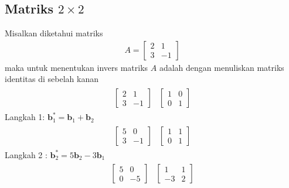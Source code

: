 \documentclass{article}   %
\begin{document}
		\subsection{Matriks $2\times 2$}
		Misalkan diketahui matriks 
		\begin{align*}
		A = \left[
		\begin{array}{rr} 
			2 & 1 \\
			3 & -1 
		\end{array} 
		\right]
	\end{align*}
maka untuk menentukan invers matriks $A$ adalah dengan menuliskan matriks identitas di sebelah kanan
 	\begin{align*}
 	\begin{array}{r|r} 
 		 \left[
 		\begin{array}{rr} 
 			2 & 1 \\
 			3 & -1 
 		\end{array} 
 		\right]  &  \left[
 		\begin{array}{rr} 
 			1 & 0 \\
 			0 & 1 
 		\end{array} 
 		\right]
 	\end{array}
 \end{align*}
Langkah 1: $\textbf{b}^*_1= \textbf{b}_1 + \textbf{b}_2$ \\
\begin{align*}
	\begin{array}{r|r} 
		\left[
		\begin{array}{rr} 
			5 & 0 \\
			3 & -1 
		\end{array} 
		\right]  &  \left[
		\begin{array}{rr} 
			1 & 1 \\
			0 & 1 
		\end{array} 
		\right]
	\end{array}
\end{align*}
Langkah 2 : $\textbf{b}^*_2= 5\textbf{b}_2 - 3\textbf{b}_1$ \\
\begin{align*}
	\begin{array}{r|r} 
		\left[
		\begin{array}{rr} 
			5 & 0 \\
			0 & -5 
		\end{array} 
		\right]  &  \left[
		\begin{array}{rr} 
			1 & 1 \\
			-3 & 2 
		\end{array} 
		\right]
	\end{array}
\end{align*}
\end{document}
